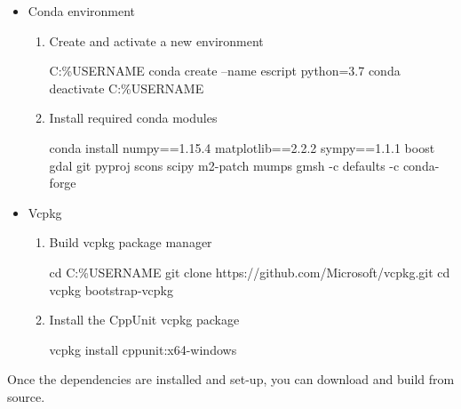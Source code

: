 \begin{itemize}
\item Conda environment
\begin{enumerate}
\item Create and activate a new environment
\begin{shellCode}
C:\Users\%USERNAME%
conda create --name escript python=3.7
conda deactivate
C:\Users\%USERNAME%
\end{shellCode}
\item Install required conda modules
\begin{shellCode}
conda install numpy==1.15.4 matplotlib==2.2.2 sympy==1.1.1
    boost gdal git pyproj scons scipy m2-patch mumps gmsh
    -c defaults -c conda-forge
\end{shellCode}
\end{enumerate}
\item Vcpkg
\begin{enumerate}
\item Build vcpkg package manager
\begin{shellCode}
cd C:\Users\%USERNAME%
git clone https://github.com/Microsoft/vcpkg.git
cd vcpkg
bootstrap-vcpkg
\end{shellCode}
\item Install the CppUnit vcpkg package
\begin{shellCode}
vcpkg install cppunit:x64-windows
\end{shellCode}
\end{enumerate}
\end{itemize}

\noindent Once the dependencies are installed and set-up, you can download and
build \escript from source.

